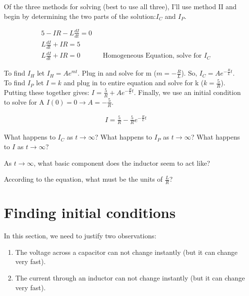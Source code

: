 Of the three methods for solving (best to use all three), I'll use method II and begin by determining the two parts of the solution:$I_C$ and $I_P$.

\begin{align*}
5-IR - L\frac{dI}{dt}=0\\
L\frac{dI}{dt}+IR = 5\\
L\frac{dI}{dt}+IR = 0 &&\text{Homogeneous Equation, solve for $I_C$}
\end{align*}

To find $I_H$ let $I_H=Ae^{mt}$. Plug in and solve for m ($m=-\frac{R}{L}$). So, $I_C=Ae^{-\frac{R}{L}t}$.\\

To find $I_P$ let $I=k$ and plug in to entire equation and solve for k ($k=\frac{5}{R}$). Putting these together gives: $I = \frac{5}{R}+Ae^{-\frac{R}{L}t}$. Finally, we use an initial condition to solve for A $I(0)=0 \rightarrow A=-\frac{5}{R}$.

\begin{align*}
I = \frac{5}{R}-\frac{5}{R}e^{-\frac{R}{L}t}
\end{align*}

\begin{blevel}
What happens to $I_C$ as $t \rightarrow \infty$? What happens to $I_P$ as $t \rightarrow \infty$? What happens to $I$ as $t \rightarrow \infty$?
\end{blevel}

\begin{blevel}
As $t \rightarrow \infty$, what basic component does the inductor seem to act like?
\end{blevel}

\begin{blevel}
According to the equation, what must be the units of $\frac{L}{R}$?
\end{blevel}

\section{Finding initial conditions}
In this section, we need to justify two observations:

\begin{enumerate}
\item The voltage across a capacitor can not change instantly (but it can change very fast).
\item The current through an inductor can not change instantly (but it can change very fast).
\end{enumerate}

